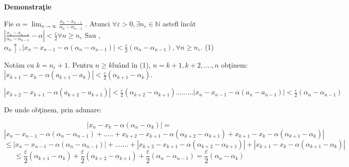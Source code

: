 \documentclass[a4paper,12pt,oneside]{report}
\begin{document}
\textbf{Demonstra\c tie} 

Fie \(\alpha = \lim_{n \to \infty }\frac{x_{n}-x_{n-1}}{\alpha _{n}-\alpha _{n-1}}\) . 
Atunci \(\forall \varepsilon > 0,\exists n_{\varepsilon }\in \mathbb{N}\) astefl \^ inc\^ at \(\left | \frac{x_{n}-x_{n-1}}{\alpha _{n}- \alpha _{n-1}} - \alpha \right |< \frac{\varepsilon }{2} \forall  n\geq n_{\varepsilon  }\)
Sau , \(\alpha _{n} \uparrow, 
\left | x_{n}- x_{n-1 }- \alpha \left ( \alpha _{n}-\alpha _{n-1} \right ) \right | < \frac{\varepsilon }{2}\left ( \alpha _{n}- \alpha _{n-1} \right ), \forall n\geq n_{\varepsilon }\). (1) 

Not\u am cu \(k=n_{\varepsilon }+1\). Pentru \(n\geq k \)lu\^ and \^ in (1), \(n= k+1, k+2,....,n\) ob\c tinem:
\(\left | x_{k+1} - x_{k} - \alpha \left ( a_{k+1}- a_{k} \right ) \right |< \frac{\varepsilon }{2}\left ( \alpha _{k+1} - \alpha _{k} \right )\). 

\(\left | x_{k+2} - x_{k+1} - \alpha \left ( a_{k+2}- a_{k+1} \right ) \right |< \frac{\varepsilon }{2}\left ( \alpha _{k+2} - \alpha _{k+1} \right )
...
...
...
\left | x_{n} - x_{n-1} - \alpha \left ( a_{n}- a_{n-1} \right ) \right |< \frac{\varepsilon }{2}\left ( \alpha _{n} - \alpha _{n-1} \right )\)

De unde ob\c tinem, prin adunare:

\begin{displaymath}
  \left | x_{n} - x_{k} - \alpha \left ( \alpha _{n}-\alpha _{k} \right ) \right |= 
\end{displaymath}
\begin{displaymath}
  \left | x_{n} - x_{n-1} -\alpha \left ( \alpha _{n}-\alpha _{n-1} \right )+.....+x_{k+2}-x_{k+1}-\alpha \left ( \alpha _{k+2}-\alpha _{k+1} \right )  +x_{k+1}-x_{k}-\alpha \left ( \alpha _{k+1}-\alpha _{k} \right )\right |
\end{displaymath}
\begin{displaymath}
  \leq \left | x_{n}-x_{n-1}-\alpha \left ( \alpha _{n}-\alpha _{n-1} \right ) \right |+.......+\left | x_{k+2}-x_{k+1}-\alpha \left ( \alpha _{k+2}-\alpha _{k+1} \right ) \right |+\left | x_{k+1}-x_{k}- \alpha \left ( \alpha _{k+1}-\alpha _{k} \right ) \right |
\end{displaymath}
\begin{displaymath}
  \leq \frac{\varepsilon }{2}\left ( \alpha _{k+1} -\alpha _{k} \right )+\frac{\varepsilon }{2}\left ( \alpha _{k+2}-\alpha _{k+1} \right )+\frac{\varepsilon }{2}\left ( \alpha _{n}- \alpha _{n-1}\right )= \frac{\varepsilon }{2}\left ( \alpha _{n}-\alpha _{k} \right )
\end{displaymath}
\end{document}
